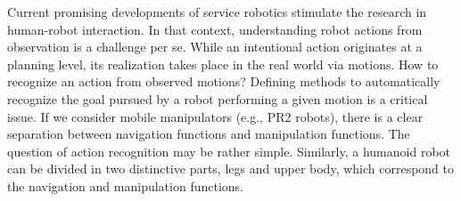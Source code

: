 \documentclass[letterpaper, 10pt, conference]{ieeeconf}      %
\begin{document}
Current promising developments of service robotics stimulate the
research in human-robot interaction. In that context, understanding
robot actions from observation is a challenge per se. While an
intentional action originates at a planning level, its realization takes
place in the real world via motions. How to recognize an action from
observed motions? Defining methods to automatically recognize the goal
pursued by a robot performing a given motion is a critical issue. If we
consider mobile manipulators (e.g., PR2 robots),
there is a clear separation between navigation functions and
manipulation functions. The question of action recognition may be rather
simple. Similarly, a humanoid robot can be divided in two distinctive parts,
legs and upper body, which correspond to the navigation and manipulation
functions.
\end{document}
